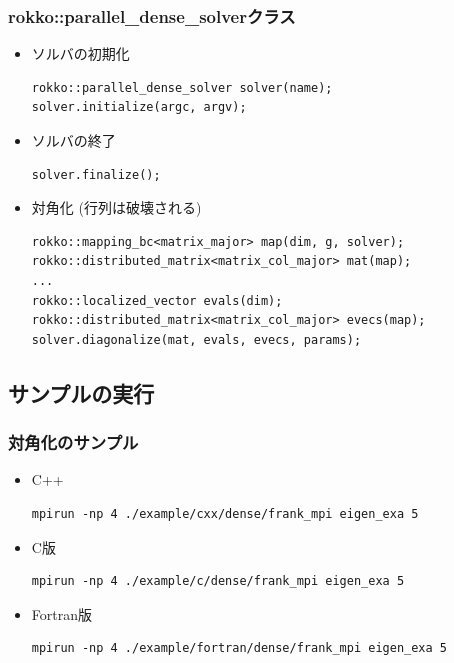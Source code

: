 \begin{frame}[c,fragile]
  \frametitle{rokko::parallel_dense_solverクラス}
  \begin{itemize}
  \item ソルバの初期化
\begin{lstlisting}
rokko::parallel_dense_solver solver(name);
solver.initialize(argc, argv);
\end{lstlisting}
  \item ソルバの終了
\begin{lstlisting}
solver.finalize();
\end{lstlisting}
  \item 対角化 (行列は破壊される)
\begin{lstlisting}
rokko::mapping_bc<matrix_major> map(dim, g, solver);
rokko::distributed_matrix<matrix_col_major> mat(map);
...
rokko::localized_vector evals(dim);
rokko::distributed_matrix<matrix_col_major> evecs(map);
solver.diagonalize(mat, evals, evecs, params);
\end{lstlisting}
  \end{itemize}
\end{frame}

\subsection{サンプルの実行}

\begin{frame}[c,fragile]
  \frametitle{対角化のサンプル}
  \begin{itemize}
  \item C++ 
\begin{lstlisting}[style=shstyle]
mpirun -np 4 ./example/cxx/dense/frank_mpi eigen_exa 5
\end{lstlisting}
  \item C版 
\begin{lstlisting}[style=shstyle]
mpirun -np 4 ./example/c/dense/frank_mpi eigen_exa 5
\end{lstlisting}
  \item Fortran版 
\begin{lstlisting}[style=shstyle]
mpirun -np 4 ./example/fortran/dense/frank_mpi eigen_exa 5
\end{lstlisting}

\end{itemize}
\end{frame}

